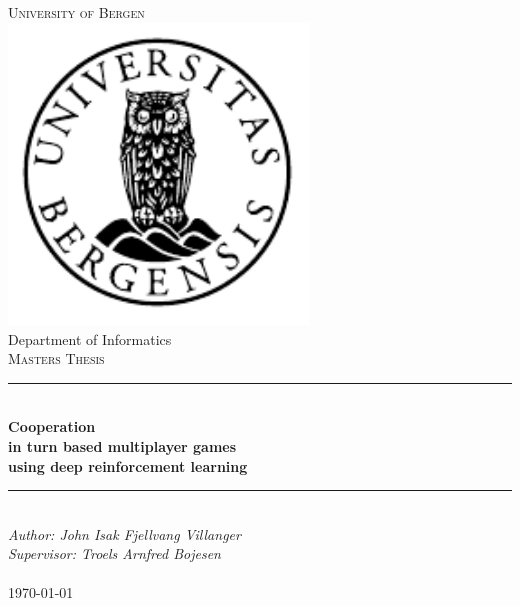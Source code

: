 \documentclass[../Main/thesis.tex]{subfiles}
\begin{document}
\newcommand{\HRule}{\rule{\linewidth}{0.5mm}}

\begin{titlepage}
\begin{center}
\textsc{\Huge University of Bergen}\\[0.4cm]
\includegraphics[width=8cm]{../Figures/uib} \\[0.5cm]

\large Department of Informatics\\[0.7cm]
\textsc{\huge Masters Thesis}\\[0.4cm]
\HRule \\[0.4cm]
{ \huge \bfseries Cooperation \\ in turn based multiplayer games \\ using deep reinforcement learning}\\[0.5cm]
\HRule \\[1.0cm]

\emph{Author: John Isak Fjellvang Villanger}\\
\emph{Supervisor: Troels Arnfred Bojesen}\\

\paragraph*{}
\end{center}
\vfill
\begin{center}
{\large \today}
\end{center}
\end{titlepage}
\end{document}
